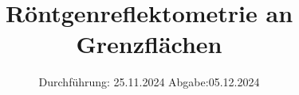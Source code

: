 

\subject{V44}
\title{Röntgenreflektometrie an Grenzflächen}
\date{%
  Durchführung: 25.11.2024
  \hspace{3em}
  Abgabe:05.12.2024
}



\maketitle
\thispagestyle{empty}
\tableofcontents
\newpage







\printbibliography{}





